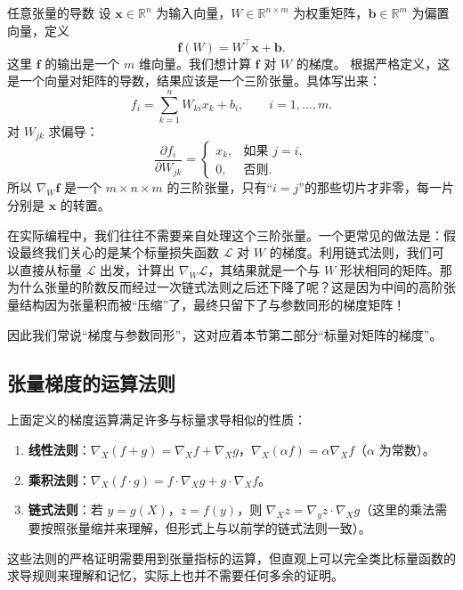 \begin{example}{任意张量的导数}{}
    设 $\mathbf{x} \in \mathbb{R}^n$ 为输入向量，$W \in \mathbb{R}^{n \times m}$ 为权重矩阵，$\mathbf{b} \in \mathbb{R}^m$ 为偏置向量，定义
    \[
        \mathbf{f}(W) = W^\top \mathbf{x} + \mathbf{b} .
    \]
    这里 $\mathbf{f}$ 的输出是一个 $m$ 维向量。我们想计算 $\mathbf{f}$ 对 $W$ 的梯度。
    \tcblower
    根据严格定义，这是一个向量对矩阵的导数，结果应该是一个三阶张量。具体写出来：
    \[
        f_i = \sum_{k=1}^n W_{ki} x_k + b_i, \qquad i = 1,\dots, m .
    \]
    对 $W_{jk}$ 求偏导：
    \[
        \frac{\partial f_i}{\partial W_{jk}} =
        \begin{cases}
            x_k, & \text{如果 } j = i ,\\
            0, & \text{否则}.
        \end{cases}
    \]
    所以 $\nabla_W \mathbf{f}$ 是一个 $m \times n \times m$ 的三阶张量，只有“$i=j$”的那些切片才非零，每一片分别是 $\mathbf{x}$ 的转置。

    在实际编程中，我们往往不需要亲自处理这个三阶张量。一个更常见的做法是：假设最终我们关心的是某个标量损失函数 $\mathcal{L}$ 对 $W$ 的梯度。利用链式法则，我们可以直接从标量 $\mathcal{L}$ 出发，计算出 $\nabla_W \mathcal{L}$，其结果就是一个与 $W$ 形状相同的矩阵。那为什么张量的阶数反而经过一次链式法则之后还下降了呢？这是因为中间的高阶张量结构因为张量积而被“压缩”了，最终只留下了与参数同形的梯度矩阵！

    因此我们常说“梯度与参数同形”，这对应着本节第二部分“标量对矩阵的梯度”。
\end{example}

\subsection{张量梯度的运算法则}

上面定义的梯度运算满足许多与标量求导相似的性质：
\begin{enumerate}
    \item \textbf{线性法则}：$\nabla_X (f + g) = \nabla_X f + \nabla_X g$，$\nabla_X (\alpha f) = \alpha \nabla_X f$（$\alpha$ 为常数）。
    \item \textbf{乘积法则}：$\nabla_X (f \cdot g) = f \cdot \nabla_X g + g \cdot \nabla_X f$。
    \item \textbf{链式法则}：若 $y = g(X)$，$z = f(y)$，则 $\nabla_X z = \nabla_y z \cdot \nabla_X g$（这里的乘法需要按照张量缩并来理解，但形式上与以前学的链式法则一致）。
\end{enumerate}
这些法则的严格证明需要用到张量指标的运算，但直观上可以完全类比标量函数的求导规则来理解和记忆，实际上也并不需要任何多余的证明。

